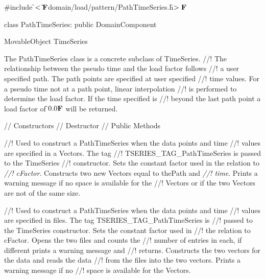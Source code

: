 
\indent \#include \f$<\tilde{ }{\bf F}$domain/load/pattern/PathTimeSeries.h\f$>{\bf F}$

\indent class PathTimeSeries: public DomainComponent

\indent MovableObject
\indent\indent TimeSeries
\indent\indent{}

\indent The PathTimeSeries class is a concrete subclass of TimeSeries.
//! The relationship between the pseudo time and the load factor follows
//! a user specified path. The path points are specified at user specified
//! time values. For a pseudo time not at a path point, linear interpolation
//! is performed to determine the load factor. If the time specified is
//! beyond the last path point a load factor of \f$0.0{\bf F}$ will be returned.

\indent // Constructors 
\indent // Destructor 
\indent // Public Methods 

//! Used to construct a PathTimeSeries when the data points and time
//! values are specified in a Vectors. The tag
//! TSERIES\_TAG\_PathTimeSeries is passed to the TimeSeries 
//! constructor. Sets the constant factor used in the relation to {\em
//! cFactor}. Constructs two new Vectors equal to \p thePath and {\em
//! time}. Prints a warning message if no space is available for the
//! Vectors or if the two Vectors are not of the same size. 

//! Used to construct a PathTimeSeries when the data points and time
//! values are specified in files. The tag TSERIES\_TAG\_PathTimeSeries is
//! passed to the TimeSeries constructor. Sets the constant factor used in
//! the relation to \p cFactor. Opens the two files and counts the
//! number of entries in each, if different prints a warning message and
//! returns. Constructs the two vectors for the data and reads the data
//! from the files into the two vectors. Prints a warning message if no
//! space is available for the Vectors.


